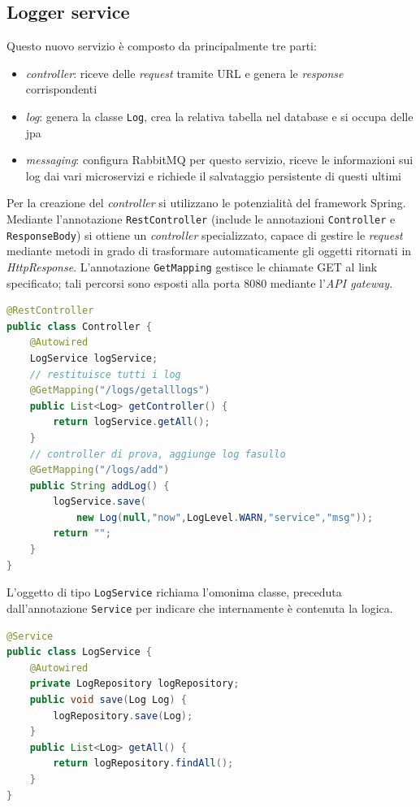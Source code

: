\subsection{Logger service}

Questo nuovo servizio è composto da principalmente tre parti:
\begin{itemize}
    \item \textit{controller}: riceve delle \textit{request} tramite URL e genera le \textit{response} corrispondenti
    \item \textit{log}: genera la classe \texttt{Log}, crea la relativa tabella nel database e si occupa delle \acrlong{jpa}
    \item \textit{messaging}: configura RabbitMQ per questo servizio, riceve le informazioni sui log dai vari microservizi e richiede il salvataggio persistente di questi ultimi 
\end{itemize}

Per la creazione del \textit{controller} si utilizzano le potenzialità del framework Spring. Mediante l'annotazione \texttt{RestController} (include le annotazioni \texttt{Controller} e \texttt{ResponseBody}) si ottiene un \textit{controller} specializzato, capace di gestire le \textit{request} mediante metodi in grado di trasformare automaticamente gli oggetti ritornati in \textit{HttpResponse}. L'annotazione \texttt{GetMapping} gestisce le chiamate GET al link specificato; tali percorsi sono esposti alla porta 8080 mediante l'\textit{API gateway}.

\begin{lstlisting}[language=Java, caption=Controller logger service, basicstyle=\footnotesize]
@RestController
public class Controller {
    @Autowired
    LogService logService;
    // restituisce tutti i log
    @GetMapping("/logs/getalllogs")
    public List<Log> getController() {
        return logService.getAll();
    }
    // controller di prova, aggiunge log fasullo
    @GetMapping("/logs/add")
    public String addLog() {
        logService.save(
            new Log(null,"now",LogLevel.WARN,"service","msg"));
        return "";
    }
}
\end{lstlisting}

L'oggetto di tipo \texttt{LogService} richiama l'omonima classe, preceduta dall'annotazione \texttt{Service} per indicare che internamente è contenuta la logica.

\begin{lstlisting}[language=Java, caption=Frammento della classe LogService, basicstyle=\footnotesize]
@Service
public class LogService {
    @Autowired
    private LogRepository logRepository;
    public void save(Log Log) {
        logRepository.save(Log);
    }
    public List<Log> getAll() {
        return logRepository.findAll();
    }
}
\end{lstlisting}

